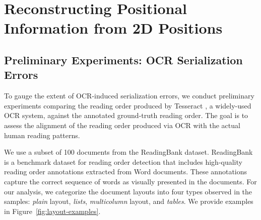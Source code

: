 

\section{Reconstructing Positional Information from 2D Positions}


\subsection{Preliminary Experiments: OCR Serialization Errors}

To gauge the extent of \ac{OCR}-induced serialization errors, we conduct preliminary experiments comparing the reading order produced by Tesseract \citep{kay2007tesseract}, a widely-used \ac{OCR} system, against the annotated ground-truth reading order. The goal is to assess the alignment of the reading order produced via \ac{OCR} with the actual human reading patterns.

We use a subset of 100 documents from the ReadingBank \citep{wang2021layoutreader} dataset. ReadingBank is a benchmark dataset for reading order detection that includes high-quality reading order annotations extracted from Word documents. These annotations capture the correct sequence of words as visually presented in the documents. For our analysis, we categorize the document layouts into four types observed in the samples: \textit{plain} layout, \textit{lists}, \textit{multicolumn} layout, and \textit{tables}. We provide examples in Figure~\ref{fig:layout-examples}.

